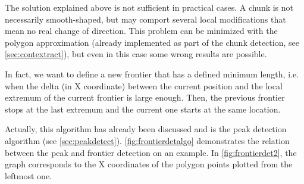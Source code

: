 The solution explained above is not sufficient in practical cases. A chunk is not necessarily smooth-shaped, but may comport several local modifications that mean no real change of direction. This problem can be minimized with the polygon approximation (already implemented as part of the chunk detection, see \autoref{sec:contextract}), but even in this case some wrong results are possible.

In fact, we want to define a new frontier that has a defined minimum length, i.e. when the delta (in X coordinate) between the current position and the local extremum of the current frontier is large enough. Then, the previous frontier stops at the last extremum and the current one starts at the same location.

Actually, this algorithm has already been discussed and is the peak detection algorithm (see \autoref{sec:peakdetect}). \autoref{fig:frontierdetalgo} demonstrates the relation between the peak and frontier detection on an example. In \autoref{fig:frontierdet2}, the graph corresponds to the X coordinates of the polygon points plotted from the leftmost one.

